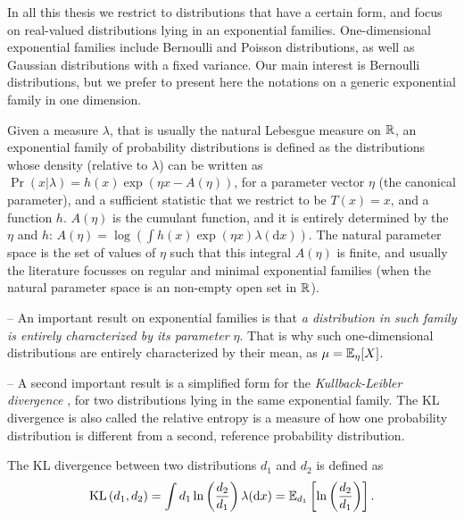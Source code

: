 In all this thesis we restrict to distributions that have a certain form, and focus on real-valued distributions lying in an exponential families.
One-dimensional exponential families include Bernoulli and Poisson distributions, as well as Gaussian distributions with a fixed variance.
Our main interest is Bernoulli distributions, but we prefer to present here the notations on a generic exponential family in one dimension.

Given a measure $\lambda$, that is usually the natural Lebesgue measure on $\mathbb{R}$, an exponential family of probability distributions is defined as the distributions whose density (relative to $\lambda$) can be written as
$ \Pr(x | \lambda) = h(x) \exp \left( \eta x - A(\eta) \right)$,
for a parameter vector $\eta$ (the canonical parameter), and a sufficient statistic that we restrict to be $T(x)=x$, and a function $h$.
$A(\eta)$ is the cumulant function, and it is entirely determined by the $\eta$ and $h$:
$A(\eta) = \log \left( \int h(x) \exp(\eta x) \lambda(\mathrm{d} x) \right)$.
%
The natural parameter space is the set of values of $\eta$ such that this integral $A(\eta)$ is finite,
and usually the literature focusses on regular and minimal exponential families (when the natural parameter space is an non-empty open set in $\mathbb{R}$).

-- An important result on exponential families is that \emph{a distribution in such family is entirely characterized by its parameter $\eta$}.
That is why such one-dimensional distributions are entirely characterized by their mean, as $\mu = \mathbb{E}_{\eta}[X]$.

-- A second important result is a simplified form for the \emph{Kullback-Leibler divergence} \cite{KullbackLeibler51}, for two distributions lying in the same exponential family.
The KL divergence is also called the relative entropy is a measure of how one probability distribution is different from a second, reference probability distribution.

\begin{defn}\label{def:2:KLDivergence}
    The KL divergence between two distributions $d_1$ and $d_2$ is defined as
    \begin{equation}\label{eq:2:Kullback-LeiblerDivergenceExpFamily1}
        \mathrm{KL}\left(d_1, d_2\right) = \int d_1 \ln\left(\frac{d_2}{d_1}\right) \lambda(\mathrm{d}x) = \mathbb{E}_{d_1} \left[ \ln\left(\frac{d_2}{d_1}\right) \right].
    \end{equation}
\end{defn}

